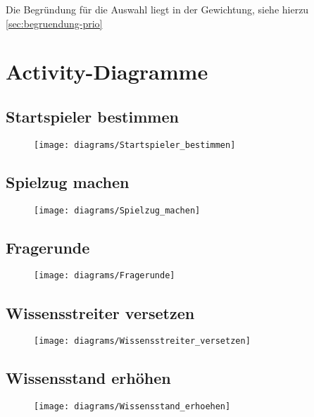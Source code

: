 Die Begründung für die Auswahl liegt in der Gewichtung, siehe hierzu \ref{sec:begruendung-prio}

\newpage
\section{Activity-Diagramme}
\subsection{Startspieler bestimmen}
\begin{figure}[h]
  \begin{center}
    \texttt{[image: diagrams/Startspieler\_bestimmen]}
  \end{center}
\end{figure}

\newpage
\subsection{Spielzug machen}
\begin{figure}[h]
  \begin{center}
    \texttt{[image: diagrams/Spielzug\_machen]}
  \end{center}
\end{figure}

\newpage
\subsection{Fragerunde}
\begin{figure}[h]
  \begin{center}
    \texttt{[image: diagrams/Fragerunde]}
  \end{center}
\end{figure}

\newpage
\subsection{Wissensstreiter versetzen}
\begin{figure}[h]
  \begin{center}
    \texttt{[image: diagrams/Wissensstreiter\_versetzen]}
  \end{center}
\end{figure}

\newpage
\subsection{Wissensstand erhöhen}
\begin{figure}[h]
  \begin{center}
    \texttt{[image: diagrams/Wissensstand\_erhoehen]}
  \end{center}
\end{figure}

